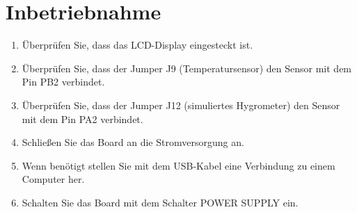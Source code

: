 \documentclass[10pt]{article}
\begin{document}
\section{Inbetriebnahme}
\begin{enumerate}
\item Überprüfen Sie, dass das LCD-Display eingesteckt ist.
\item Überprüfen Sie, dass der Jumper J9 (Temperatursensor) den Sensor mit dem Pin PB2 verbindet.
\item Überprüfen Sie, dass der Jumper J12 (simuliertes Hygrometer) den Sensor mit dem Pin PA2 verbindet.
\item Schließen Sie das Board an die Stromversorgung an.
\item Wenn benötigt stellen Sie mit dem USB-Kabel eine Verbindung zu einem Computer her.
\item Schalten Sie das Board mit dem Schalter POWER SUPPLY ein.
\end{enumerate}
\end{document}
